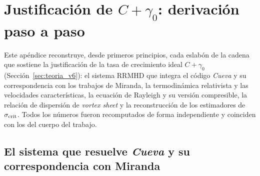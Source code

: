 
\section{Justificación de $C+\gamma_0$: derivación paso a paso}
\label{ap:justificacion}

\primerparrafo Este apéndice reconstruye, desde primeros principios, cada eslabón de la cadena que sostiene la justificación de la tasa de crecimiento ideal $C+\gamma_0$ (Sección~\ref{sec:teoria_v6}): el sistema RRMHD que integra el código \textit{Cueva} y su correspondencia con los trabajos de Miranda, la termodinámica relativista y las velocidades características, la ecuación de Rayleigh y su versión compresible, la relación de dispersión de \emph{vortex sheet} y la reconstrucción de los estimadores de $\sigma_{\mathrm{crit}}$. Todos los números fueron recomputados de forma independiente y coinciden con los del cuerpo del trabajo.

\subsection{El sistema que resuelve \textit{Cueva} y su correspondencia con Miranda}
\label{ap:cueva}


